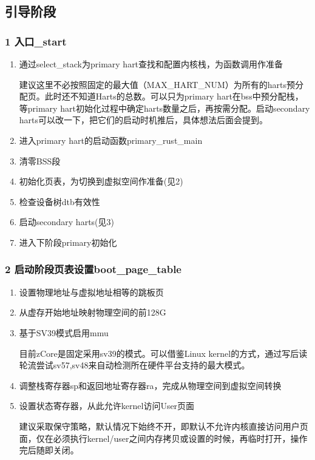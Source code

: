 \documentclass[
8pt, %
]{beamer}
\begin{document}
	\subsection{引导阶段}
	
	\begin{frame}
		\frametitle{1 入口\_start}
		\begin{enumerate}
			\item 通过select\_stack为primary hart查找和配置内核栈，为函数调用作准备
			\begin{block}{}
			建议这里不必按照固定的最大值（MAX\_HART\_NUM）为所有的harts预分配页。此时还不知道Harts的总数。可以只为primary hart在bss中预分配栈，等primary hart初始化过程中确定harts数量之后，再按需分配。启动secondary harts可以改一下，把它们的启动时机推后，具体想法后面会提到。
			\end{block}
			\item 进入primary hart的启动函数primary\_rust\_main
			\item 清零BSS段
			\item 初始化页表，为切换到虚拟空间作准备(见2)
			\item 检查设备树dtb有效性
			\item 启动secondary harts(见3)
			\item 进入下阶段primary初始化
		\end{enumerate}
	\end{frame}

	\begin{frame}
		\frametitle{2 启动阶段页表设置boot\_page\_table}
		\begin{enumerate}
			\item 设置物理地址与虚拟地址相等的跳板页
			\item 从虚存开始地址映射物理空间的前128G
			\item 基于SV39模式启用mmu
			\begin{block}{}
				目前zCore是固定采用sv39的模式。可以借鉴Linux kernel的方式，通过写后读轮流尝试sv57,sv48来自动检测所在硬件平台支持的最大模式。
			\end{block}
			\item 调整栈寄存器sp和返回地址寄存器ra，完成从物理空间到虚拟空间转换
			\item 设置状态寄存器，从此允许kernel访问User页面
			\begin{block}{}
				建议采取保守策略，默认情况下始终不开，即默认不允许内核直接访问用户页面，仅在必须执行kernel/user之间内存拷贝或设置的时候，再临时打开，操作完后随即关闭。
			\end{block}
		\end{enumerate}
	\end{frame}
\end{document}
